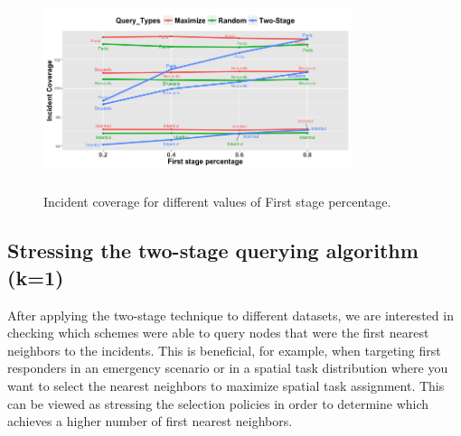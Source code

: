 \documentclass{acm_proc_article-sp}
\begin{document}
\begin{figure}[!h]
\centering
\includegraphics[width=9cm ,height=6cm]{figuresPng/citiesInc.png}
\caption{Incident coverage for different values of First stage percentage. }
\label{fig: hollaIncCoverage}
\end{figure}
\subsection{Stressing the two-stage querying algorithm (k=1)}
After applying the two-stage technique to different datasets, we are interested in checking which schemes were able to query nodes that were the first nearest neighbors to the incidents. This is beneficial, for example, when targeting first responders in an emergency scenario or in a spatial task distribution where you want to select the nearest neighbors to maximize spatial task assignment. This can be viewed as stressing the selection policies in order to determine which achieves a higher number of first nearest neighbors.\par
\end{document}
